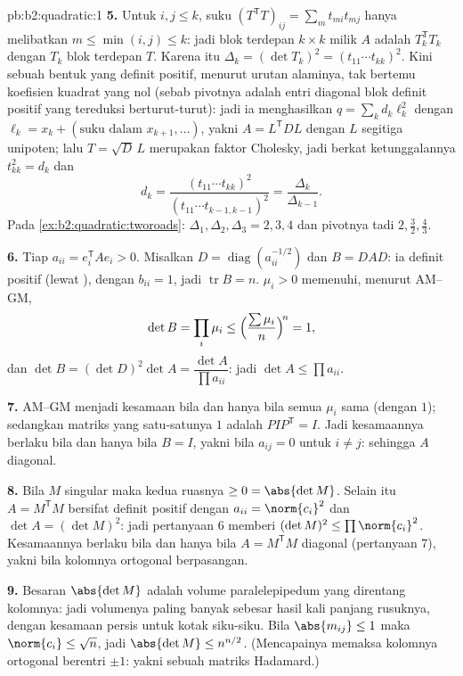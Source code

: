 \begin{solution}{pb:b2:quadratic:1}
\textbf{5.} Untuk $i, j \leq k$, suku $(T^{\mathsf T}T)_{ij} = \sum_m
t_{mi}t_{mj}$ hanya melibatkan $m \leq \min(i,j) \leq k$: jadi
blok terdepan $k\times k$ milik $A$ adalah $T_k^{\mathsf T}T_k$ dengan
$T_k$ blok terdepan $T$. Karena itu $\Delta_k = (\det T_k)^2
= (t_{11}\cdots t_{kk})^2$. Kini  sebuah
bentuk yang definit positif, menurut urutan alaminya, tak bertemu koefisien
kuadrat yang nol (sebab pivotnya adalah entri diagonal blok
definit positif yang tereduksi berturut-turut): jadi ia menghasilkan $q
= \sum_k d_k\ell_k^2$ dengan $\ell_k = x_k + (\text{suku dalam }
x_{k+1}, \dots)$, yakni $A = L^{\mathsf T}DL$ dengan $L$
segitiga unipoten; lalu $T = \sqrt D\,L$ merupakan faktor
Cholesky, jadi berkat ketunggalannya $t_{kk}^2 = d_k$ dan
\[
d_k = \frac{(t_{11}\cdots t_{kk})^2}
{(t_{11}\cdots t_{k-1,k-1})^2}
= \frac{\Delta_k}{\Delta_{k-1}} .
\]
Pada \cref{ex:b2:quadratic:tworoads}: $\Delta_1, \Delta_2,
\Delta_3 = 2, 3, 4$ dan pivotnya tadi $2, \frac32, \frac43$.

\textbf{6.} Tiap $a_{ii} = e_i^{\mathsf T}Ae_i > 0$. Misalkan $D =
\operatorname{diag}(a_{ii}^{-1/2})$ dan $B = DAD$: ia definit
positif (lewat ), dengan $b_{ii} = 1$, jadi $\operatorname{tr}
B = n$.  $\mu_i > 0$ memenuhi, menurut AM--GM,
\[
\det B = \prod_i\mu_i
\leq \Bigl(\frac{\sum\mu_i}{n}\Bigr)^{\!n} = 1 ,
\]
dan $\det B = (\det D)^2\det A = \dfrac{\det A}{\prod
a_{ii}}$: jadi $\det A \leq \prod a_{ii}$.

\textbf{7.} AM--GM menjadi kesamaan bila dan hanya bila semua $\mu_i$ sama
(dengan $1$); sedangkan matriks  yang satu-satunya  $1$
adalah $PIP^{\mathsf T} = I$. Jadi kesamaannya berlaku bila dan hanya bila $B = I$,
yakni bila $a_{ij} = 0$ untuk $i \neq j$: sehingga $A$ diagonal.

\textbf{8.} Bila $M$ singular maka kedua ruasnya $\geq 0 =
\abs{\det M}$. Selain itu $A = M^{\mathsf T}M$ bersifat definit
positif dengan $a_{ii} = \norm{c_i}^2$ dan $\det A = (\det
M)^2$: jadi pertanyaan 6 memberi $(\det M)^2 \leq \prod\norm{c_i}^2$.
Kesamaannya berlaku bila dan hanya bila $A = M^{\mathsf T}M$ diagonal (pertanyaan 7),
yakni bila kolomnya ortogonal berpasangan.

\textbf{9.} Besaran $\abs{\det M}$ adalah volume paralelepipedum
yang direntang kolomnya: jadi volumenya paling banyak sebesar hasil kali
panjang rusuknya, dengan kesamaan persis untuk kotak siku-siku.
Bila $\abs{m_{ij}} \leq 1$ maka $\norm{c_i} \leq \sqrt n$, jadi
$\abs{\det M} \leq n^{n/2}$. (Mencapainya memaksa kolomnya
ortogonal berentri $\pm1$: yakni sebuah matriks Hadamard.)


\end{solution}
